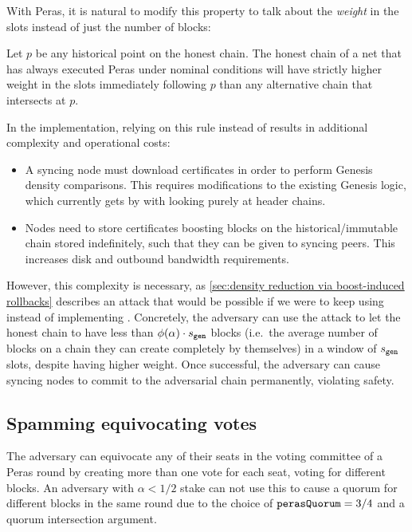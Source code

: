 \medskip
With Peras, it is natural to modify this property to talk about the \emph{weight} in the \sgen{} slots instead of just the number of blocks:
\begin{tcolorbox}[title=\weightedDensityOfCompetingChainsName]\label{property:weighted-density-of-competing-chains}
  Let $p$ be any historical point on the honest chain. The honest chain of a net that has always executed Peras under nominal conditions will have strictly higher weight in the \sgen{} slots immediately following $p$ than any alternative chain that intersects at $p$.
\end{tcolorbox}
In the implementation, relying on this rule instead of \densityOfCompetingChains{} results in additional complexity and operational costs:
\begin{itemize}
\item A syncing node must download certificates in order to perform Genesis density comparisons.
  This requires modifications to the existing Genesis logic, which currently gets by with looking purely at header chains.
\item Nodes need to store certificates boosting blocks on the historical/immutable chain stored indefinitely, such that they can be given to syncing peers.
  This increases disk and outbound bandwidth requirements.
\end{itemize}
However, this complexity is necessary, as \cref{sec:density reduction via boost-induced rollbacks} describes an attack that would be possible if we were to keep using \densityOfCompetingChains{} instead of implementing \weightedDensityOfCompetingChains{}.
Concretely, the adversary can use the attack to let the honest chain to have less than $\phi(\alpha) \cdot s_{\mathtt{gen}}$ blocks (i.e.\ the average number of blocks on a chain they can create completely by themselves) in a window of $s_{\mathtt{gen}}$ slots, despite having higher weight.
Once successful, the adversary can cause syncing nodes to commit to the adversarial chain permanently, violating safety.

\subsection{Spamming equivocating votes}\label{sec:attack equivocations}

The adversary can equivocate any of their seats in the voting committee of a Peras round by creating more than one vote for each seat, voting for different blocks.
An adversary with $\alpha<1/2$ stake can not use this to cause a quorum for different blocks in the same round due to the choice of $\mathtt{perasQuorum} = 3/4$ and a quorum intersection argument.

